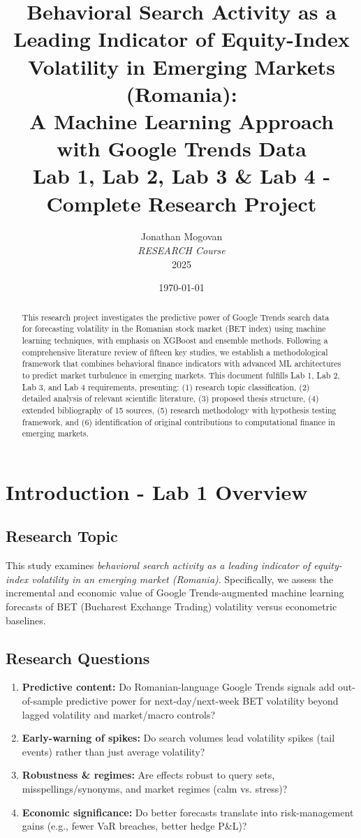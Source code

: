 \documentclass[12pt,a4paper]{article}
\title{\textbf{Behavioral Search Activity as a Leading Indicator of Equity-Index Volatility in Emerging Markets (Romania): \\
A Machine Learning Approach with Google Trends Data\\
\large Lab 1, Lab 2, Lab 3 \& Lab 4 - Complete Research Project}}
\author{Jonathan Mogovan\\
\textit{RESEARCH Course}\\
2025}
\date{\today}
\begin{document}
\maketitle

\begin{abstract}
This research project investigates the predictive power of Google Trends search data for forecasting volatility in the Romanian stock market (BET index) using machine learning techniques, with emphasis on XGBoost and ensemble methods. Following a comprehensive literature review of fifteen key studies, we establish a methodological framework that combines behavioral finance indicators with advanced ML architectures to predict market turbulence in emerging markets. This document fulfills Lab 1, Lab 2, Lab 3, and Lab 4 requirements, presenting: (1) research topic classification, (2) detailed analysis of relevant scientific literature, (3) proposed thesis structure, (4) extended bibliography of 15 sources, (5) research methodology with hypothesis testing framework, and (6) identification of original contributions to computational finance in emerging markets.
\end{abstract}

\tableofcontents
\newpage

\section{Introduction - Lab 1 Overview}

\subsection{Research Topic}
This study examines \textit{behavioral search activity as a leading indicator of equity-index volatility in an emerging market (Romania)}. Specifically, we assess the incremental and economic value of Google Trends-augmented machine learning forecasts of BET (Bucharest Exchange Trading) volatility versus econometric baselines.

\subsection{Research Questions}
\begin{enumerate}
    \item \textbf{Predictive content:} Do Romanian-language Google Trends signals add out-of-sample predictive power for next-day/next-week BET volatility beyond lagged volatility and market/macro controls?
    \item \textbf{Early-warning of spikes:} Do search volumes lead volatility spikes (tail events) rather than just average volatility?
    \item \textbf{Robustness \& regimes:} Are effects robust to query sets, misspellings/synonyms, and market regimes (calm vs. stress)?
    \item \textbf{Economic significance:} Do better forecasts translate into risk-management gains (e.g., fewer VaR breaches, better hedge P\&L)?
\end{enumerate}
\end{document}
